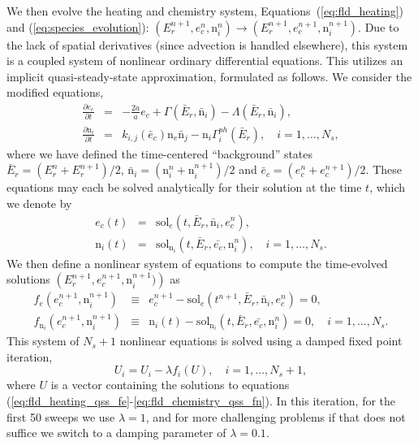 We then evolve the heating and chemistry system, Equations~(\ref{eq:fld_heating})
and (\ref{eq:species_evolution}):  
$(E_r^{n+1}, e_c^n, {\mathrm n}_i^n) \to (E_r^{n+1}, e_c^{n+1},
{\mathrm n}_i^{n+1})$.  Due to the lack of spatial derivatives (since
advection is handled elsewhere), this system is a coupled system of
nonlinear ordinary differential equations.  This utilizes an implicit
quasi-steady-state approximation, formulated as follows.  We consider
the modified equations,
\begin{eqnarray}
  \label{eq:fld_heating_qss}
  \frac{\partial e_c}{\partial t} &=& -\frac{2\dot{a}}{a} e_c +
    \Gamma\left(\bar{E}_r,\bar{\mathrm n}_i\right) - 
    \Lambda\left(\bar{E}_r,\bar{\mathrm n}_i\right), \\
  \label{eq:fld_chemistry_qss}
  \frac{\partial {\mathrm n}_i}{\partial t} &=& k_{i,j}\left(\bar{e}_c\right)
    {\mathrm n}_e \bar{\mathrm n}_j - {\mathrm n}_i 
    \Gamma_i^{ph}\left(\bar{E}_r\right), \quad i=1,\ldots,N_s,
\end{eqnarray}
where we have defined the time-centered ``background'' states
$\bar{E}_r = \left(E_r^{n}+E_r^{n+1}\right)/2$, 
$\bar{\mathrm n}_i = \left({\mathrm n}_i^{n}+{\mathrm n}_i^{n+1}\right)/2$
and $\bar{e}_c = \left(e_c^{n}+e_c^{n+1}\right)/2$.  These equations
may each be solved analytically for their solution at the time
$t$, which we denote by
\begin{eqnarray}
  \label{eq:fld_heating_qss_sol}
  e_c(t) &=& \text{sol}_{e}\left(t,\bar{E}_r,\bar{\mathrm n}_i,e_c^n\right), \\
  \label{eq:fld_chemistry_qss_sol}
  {\mathrm n}_i(t) &=& \text{sol}_{\mathrm n_i}
  \left(t,\bar{E}_r,\bar{e_c},\mathrm n_i^n\right), \quad i=1,\ldots,N_s. 
\end{eqnarray}
We then define a nonlinear system of equations to compute the
time-evolved solutions $\left(E_r^{n+1}, e_c^{n+1}, 
{\mathrm n}_i^{n+1})\right)$ as
\begin{eqnarray}
  \label{eq:fld_heating_qss_fe}
  f_e(e_c^{n+1},{\mathrm n}_i^{n+1}) &\equiv& e_c^{n+1} -
    \text{sol}_{e}\left(t^{n+1},\bar{E}_r,\bar{\mathrm n}_i,e_c^n\right)
    = 0, \\
  \label{eq:fld_chemistry_qss_fn}
  f_{\mathrm n_i}(e_c^{n+1},{\mathrm n}_i^{n+1}) &\equiv& 
    {\mathrm n}_i(t) - \text{sol}_{\mathrm n_i}
    \left(t,\bar{E}_r,\bar{e_c},\mathrm n_i^n\right)=0, \quad
    i=1,\ldots,N_s.  
\end{eqnarray}
This system of $N_s+1$ nonlinear equations is solved using a damped
fixed point iteration, 
\[
   U_i = U_i - \lambda f_i(U), \quad i=1,\ldots,N_s+1,
\]
where $U$ is a vector containing the solutions to equations
(\ref{eq:fld_heating_qss_fe}-\ref{eq:fld_chemistry_qss_fn}).  In this
iteration, for the first 50 sweeps we use $\lambda=1$, and for more
challenging problems if that does not suffice we switch to a damping
parameter of $\lambda=0.1$.
